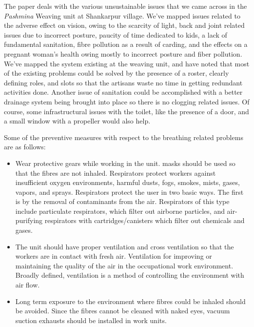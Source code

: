 \documentclass[journal]{IEEEtran}
\begin{document}
The paper deals with the various unsustainable issues that we came across in the \textit{Pashmina} Weaving unit at Shankarpur village. We've mapped issues related to the adverse effect on vision, owing to the scarcity of light, back and joint related issues due to incorrect posture, paucity of time dedicated to kids, a lack of fundamental sanitation, fibre pollution as a result of carding, and the effects on a pregnant woman's health owing mostly to incorrect posture and fiber pollution. We've mapped the system existing at the weaving unit, and have noted that most of the existing problems could be solved by the presence of a roster, clearly defining roles, and slots so that the artisans waste no time in getting redundant activities done. Another issue of sanitation could be accomplished with a better drainage system being brought into place so there is no clogging related issues. Of course, some infrastructural issues with the toilet, like the presence of a door, and a small window with a propeller would also help. 

\par
Some of the preventive measures with respect to the breathing related problems are as follows:

\begin{itemize}
    \item Wear protective gears while working in the unit. masks should be used so that the fibres are not inhaled. Respirators protect workers against insufficient oxygen environments, harmful dusts, fogs, smokes, mists, gases, vapors, and sprays. Respirators protect the user in two basic ways. The first is by the removal of contaminants from the air. Respirators of this type include particulate respirators, which filter out airborne particles, and air-purifying respirators with cartridges/canisters which filter out chemicals and gases.
    \item The unit should have proper ventilation and cross ventilation so that the workers are in contact with fresh air. Ventilation for improving or maintaining the quality of the air in the occupational work environment. Broadly defined, ventilation is a method of controlling the environment with air flow.
    \item Long term exposure to the environment where fibres could be inhaled should be avoided. Since the fibres cannot be cleaned with naked eyes, vacuum suction exhausts should be installed in work units.
    

\end{itemize}
\end{document}
